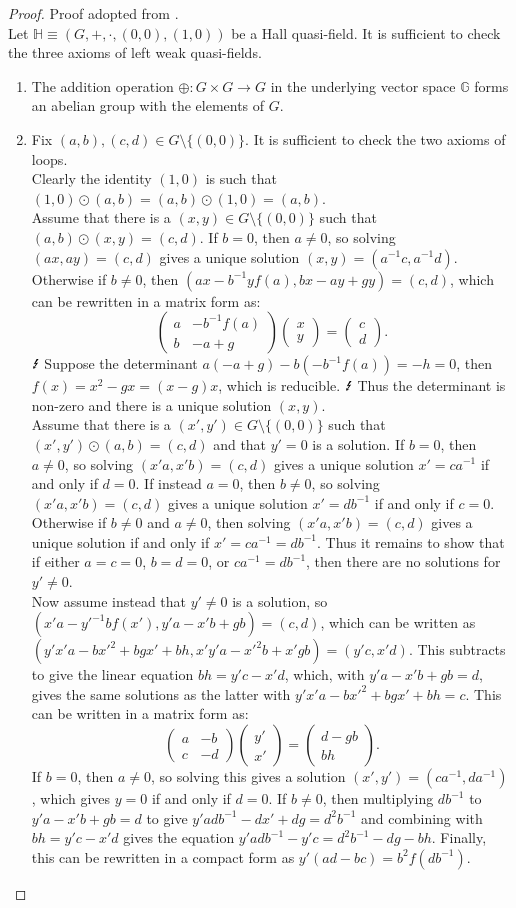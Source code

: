 \documentclass{report}
\renewcommand{\H}{\mathbb{H}}
\newcommand{\G}{\mathbb{G}}
\newcommand{\two}[2]{\begin{pmatrix} #1 \\ #2 \end{pmatrix}}
\theoremstyle{definition}\newtheorem*{definition}{Definition}
\theoremstyle{definition}\newtheorem*{example}{Example}
\theoremstyle{remark}\newtheorem*{remark}{Remark}
\begin{document}
\begin{proof}
Proof adopted from \cite{5}. \\
Let $ \H \equiv (G, +, \cdot, (0, 0), (1, 0)) $ be a Hall quasi-field. It is sufficient to check the three axioms of left weak quasi-fields.
\begin{enumerate}
  \item The addition operation $ \oplus : G \times G \to G $ in the underlying vector space $ \G $ forms an abelian group with the elements of $ G $.
  \item Fix $ (a, b), (c, d) \in G \setminus \{ (0, 0) \} $. It is sufficient to check the two axioms of loops. \\
    Clearly the identity $ (1, 0) $ is such that $ (1, 0) \odot (a, b) = (a, b) \odot (1, 0) = (a, b) $. \\
    Assume that there is a $ (x, y) \in G \setminus \{ (0, 0) \} $ such that $ (a, b) \odot (x, y) = (c, d) $. If $ b = 0 $, then $ a \ne 0 $, so solving $ (ax, ay) = (c, d) $ gives a unique solution $ (x, y) = (a^{-1} c, a^{-1} d) $. Otherwise if $ b \ne 0 $, then $ (ax - b^{-1} y f(a), bx - ay + gy) = (c, d) $, which can be rewritten in a matrix form as: $$ \two{a & -b^{-1} f(a)}{b & -a + g} \two{x}{y} = \two{c}{d}. $$ $ \text{\Lightning} $ Suppose the determinant $ a (-a + g) - b (-b^{-1} f(a)) = -h = 0 $, then $ f(x) = x^2 - gx = (x - g) x $, which is reducible. $ \text{\Lightning} $ Thus the determinant is non-zero and there is a unique solution $ (x, y) $. \\
    Assume that there is a $ (x', y') \in G \setminus \{ (0, 0) \} $ such that $ (x', y') \odot (a, b) = (c, d) $ and that $ y' = 0 $ is a solution. If $ b = 0 $, then $ a \ne 0 $, so solving $ (x'a, x'b) = (c, d) $ gives a unique solution $ x' = ca^{-1} $ if and only if $ d = 0 $. If instead $ a = 0 $, then $ b \ne 0 $, so solving $ (x'a, x'b) = (c, d) $ gives a unique solution $ x' = db^{-1} $ if and only if $ c = 0 $. Otherwise if $ b \ne 0 $ and $ a \ne 0 $, then solving $ (x'a, x'b) = (c, d) $ gives a unique solution if and only if $ x' = ca^{-1} = db^{-1} $. Thus it remains to show that if either $ a = c = 0 $, $ b = d = 0 $, or $ ca^{-1} = db^{-1} $, then there are no solutions for $ y' \ne 0 $. \\
    Now assume instead that $ y' \ne 0 $ is a solution, so $ (x'a - y'^{-1} b f(x'), y'a - x'b + gb) = (c, d) $, which can be written as $ (y'x'a - bx'^2 + bgx' + bh, x'y'a - x'^2 b + x'gb) = (y'c, x'd) $. This subtracts to give the linear equation $ bh = y'c - x'd $, which, with $ y'a - x'b + gb = d $, gives the same solutions as the latter with $ y'x'a - bx'^2 + bgx' + bh = c $. This can be written in a matrix form as: $$ \two{a & -b}{c & -d} \two{y'}{x'} = \two{d - gb}{bh}. $$ If $ b = 0 $, then $ a \ne 0 $, so solving this gives a solution $ (x', y') = (ca^{-1}, da^{-1}) $, which gives $ y = 0 $ if and only if $ d = 0 $. If $ b \ne 0 $, then multiplying $ db^{-1} $ to $ y'a - x'b + gb = d $ to give $ y'adb^{-1} - dx' + dg = d^2 b^{-1} $ and combining with $ bh = y'c - x'd $ gives the equation $ y'adb^{-1} - y'c = d^2 b^{-1} - dg - bh $. Finally, this can be rewritten in a compact form as $ y' (ad - bc) = b^2 f(db^{-1}) $. \\

\end{enumerate}
\end{proof}
\end{document}
